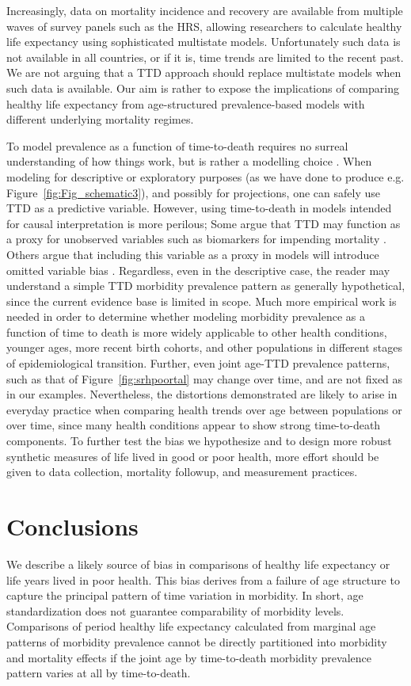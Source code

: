 \documentclass[11pt,oneside,a4paper]{article} %
\begin{document}
Increasingly, data on mortality incidence and recovery are available from
multiple waves of survey panels such as the HRS, allowing researchers to
calculate healthy life expectancy using sophisticated multistate models.
Unfortunately such data is not available in all countries, or if it is, time
trends are limited to the recent past. We are not arguing that a TTD approach
should replace multistate models when such data is available. Our aim is rather
to expose the implications of comparing healthy life expectancy from
age-structured prevalence-based models with different underlying mortality
regimes.

To model prevalence as a function of
time-to-death requires no surreal understanding of how things work, but is
rather a modelling choice \citep{wolf2015disability}. When modeling for
descriptive or exploratory purposes (as we have done to produce e.g. Figure~\ref{fig:Fig_schematic3}),
and possibly for projections, one can safely use
TTD as a predictive variable.
However, using time-to-death in models intended for causal interpretation is more perilous; Some argue that TTD may function as a proxy for unobserved variables such as biomarkers for impending mortality \citep{wolf2015disability}. Others argue that including this variable as a proxy in models will introduce omitted variable bias \citep{lynch2015commentary}. Regardless, even in the descriptive case, the reader may understand a simple TTD morbidity prevalence pattern as generally hypothetical, since the current evidence base is limited in scope. Much more empirical work is needed in order to determine whether modeling morbidity
prevalence as a function of time to death is more widely applicable to
other health conditions, younger ages, more recent birth
cohorts, and other populations in different stages of epidemiological
transition. Further, even joint age-TTD prevalence patterns, such as that of Figure~\ref{fig:srhpoortal} may change over time, and are not fixed as in our examples. Nevertheless, the distortions demonstrated are likely to arise in everyday practice when comparing health trends over age between populations or over time, since many health conditions appear to show strong time-to-death components. To further test the bias we hypothesize and to design more robust synthetic measures of life lived in good or poor health, more effort should be given to data collection, mortality followup, and measurement practices.

\section{Conclusions}
We describe a likely source of bias in comparisons of healthy life expectancy or life years lived in poor health. This bias derives from a failure of age structure to capture the principal pattern of time variation in morbidity. In short, age standardization does not guarantee comparability of morbidity levels. Comparisons of period healthy life expectancy calculated from marginal age patterns of morbidity prevalence cannot be directly partitioned into morbidity and mortality effects if the joint age by time-to-death morbidity prevalence pattern varies at all by time-to-death. 
\end{document}
